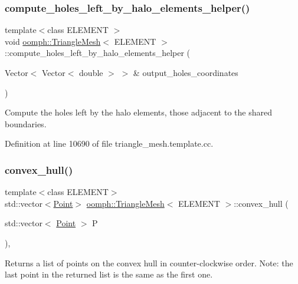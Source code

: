 \subsubsection{\texorpdfstring{compute\+\_\+holes\+\_\+left\+\_\+by\+\_\+halo\+\_\+elements\+\_\+helper()}{compute\_holes\_left\_by\_halo\_elements\_helper()}}
{\footnotesize\ttfamily template$<$class E\+L\+E\+M\+E\+NT $>$ \\
void \hyperlink{classoomph_1_1TriangleMesh}{oomph\+::\+Triangle\+Mesh}$<$ E\+L\+E\+M\+E\+NT $>$\+::compute\+\_\+holes\+\_\+left\+\_\+by\+\_\+halo\+\_\+elements\+\_\+helper (\begin{DoxyParamCaption}\item[{Vector$<$ Vector$<$ double $>$ $>$ \&}]{output\+\_\+holes\+\_\+coordinates }\end{DoxyParamCaption})\hspace{0.3cm}{\ttfamily [protected]}}



Compute the holes left by the halo elements, those adjacent to the shared boundaries. 



Definition at line 10690 of file triangle\+\_\+mesh.\+template.\+cc.

\mbox{\label{classoomph_1_1TriangleMesh_a97228c6d359e1e58efb45dcba1386969}} 
\subsubsection{\texorpdfstring{convex\+\_\+hull()}{convex\_hull()}}
{\footnotesize\ttfamily template$<$class E\+L\+E\+M\+E\+NT$>$ \\
std\+::vector$<$\hyperlink{structoomph_1_1TriangleMesh_1_1Point}{Point}$>$ \hyperlink{classoomph_1_1TriangleMesh}{oomph\+::\+Triangle\+Mesh}$<$ E\+L\+E\+M\+E\+NT $>$\+::convex\+\_\+hull (\begin{DoxyParamCaption}\item[{std\+::vector$<$ \hyperlink{structoomph_1_1TriangleMesh_1_1Point}{Point} $>$}]{P }\end{DoxyParamCaption})\hspace{0.3cm}{\ttfamily [inline]}, {\ttfamily [private]}}



Returns a list of points on the convex hull in counter-\/clockwise order. Note\+: the last point in the returned list is the same as the first one. 



